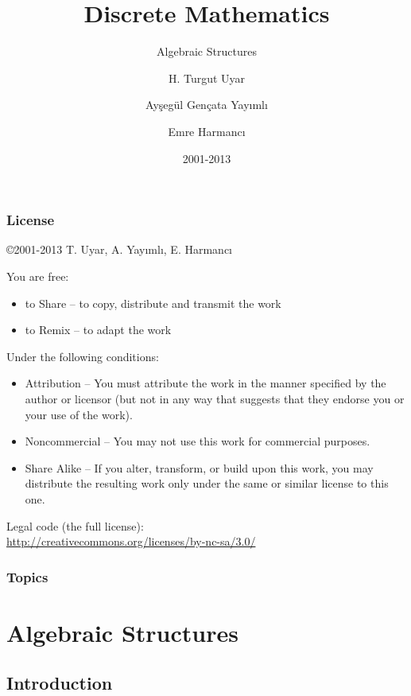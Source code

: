 \documentclass[dvipsnames]{beamer}
\title{Discrete Mathematics}
\subtitle{Algebraic Structures}
\author{H. Turgut Uyar \and Ayşegül Gençata Yayımlı \and Emre Harmancı}
\date{2001-2013}
\begin{document}
\begin{frame}
  \titlepage
\end{frame}

\begin{frame}
  \frametitle{License}

  \hfill
  \copyright 2001-2013 T. Uyar, A. Yayımlı, E. Harmancı

  \vfill
  \begin{tiny}
    You are free:
    \begin{itemize}
      \item to Share -- to copy, distribute and transmit the work
      \item to Remix -- to adapt the work
    \end{itemize}

    Under the following conditions:
    \begin{itemize}
      \item Attribution -- You must attribute the work in the manner specified by
        the author or licensor (but not in any way that suggests that they
        endorse you or your use of the work).

      \item Noncommercial -- You may not use this work for commercial purposes.

      \item Share Alike -- If you alter, transform, or build upon this work, you
        may distribute the resulting work only under the same or similar license
        to this one.
    \end{itemize}
  \end{tiny}

  \vfill
  Legal code (the full license):\\
  \url{http://creativecommons.org/licenses/by-nc-sa/3.0/}
\end{frame}

\begin{frame}
  \frametitle{Topics}
  \tableofcontents
\end{frame}

\section{Algebraic Structures}

\subsection{Introduction}
\end{document}
